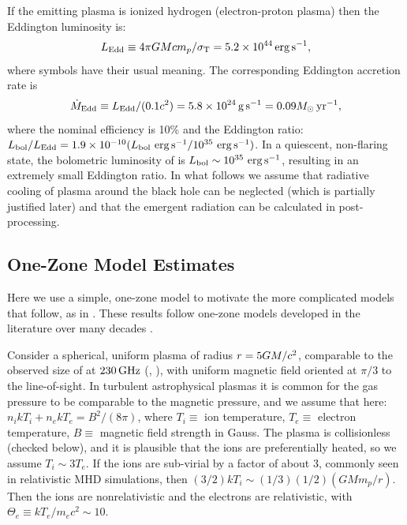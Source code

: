 If the emitting plasma is ionized hydrogen (electron-proton plasma) then the Eddington luminosity is:
\begin{equation}
L_\mathrm{Edd} \equiv 4\pi G\mbh c m_p/\sigma_\mathrm{T} = 5.2 \times 10^{44}\erg \sec^{-1},
\end{equation}
where symbols have their usual meaning.
The corresponding Eddington accretion rate is
\begin{equation}
\dot\mbh_\mathrm{Edd} \equiv L_\mathrm{Edd}/(0.1 c^2) = 5.8 \times 10^{24} \gm \sec^{-1} = 0.09 \msun \yr^{-1},
\end{equation}
where the nominal efficiency is 10\% and the Eddington ratio:
$L_\mathrm{bol}/L_\mathrm{Edd} = 1.9 \times 10^{-10} (L_\mathrm{bol} \,\,\mathrm{erg}\,\mathrm{s}^{-1} /10^{35} \,\,\mathrm{erg}\,\mathrm{s}^{-1})$.
In a quiescent, non-flaring state, the bolometric luminosity of \sgra is $L_\mathrm{bol} \sim 10^{35}\,\,\mathrm{erg}\,\mathrm{s}^{-1}$, resulting in an extremely small Eddington ratio.
In what follows we assume that radiative cooling of plasma around the black hole can be neglected (which is partially justified later) and that the emergent radiation can be calculated in post-processing.

\subsection{One-Zone Model Estimates}

Here we use a simple, one-zone model to motivate the more complicated models that follow, as in .  These results follow one-zone models developed in the literature over many decades \citep[e.g.][]{1996IAUS..169..169F}.

Consider a spherical, uniform plasma of radius $r = 5GM/c^2$, comparable to the observed size of \sgra at $230\,\mathrm{GHz}$ (, ), with uniform magnetic field oriented at $\pi/3$ to the line-of-sight.  In turbulent astrophysical plasmas it is common for  the gas pressure to be comparable to the magnetic pressure, and we assume that here: $n_i k T_i + n_e k T_e = B^2/(8\pi)$, where $T_i \equiv$ ion temperature, $T_e \equiv$ electron temperature, $B \equiv$ magnetic field strength in Gauss.  The plasma is collisionless (checked below), and it is plausible that the ions are preferentially heated, so we assume $T_i \sim 3 T_e$.  If the ions are sub-virial by a factor of about $3$, commonly seen in relativistic MHD simulations, then $(3/2) k T_i \sim (1/3) (1/2) (G M m_p/r)$.  Then the ions are nonrelativistic and the electrons are relativistic, with $\Theta_e \equiv  k T_e / m_e c^2 \sim 10$.


